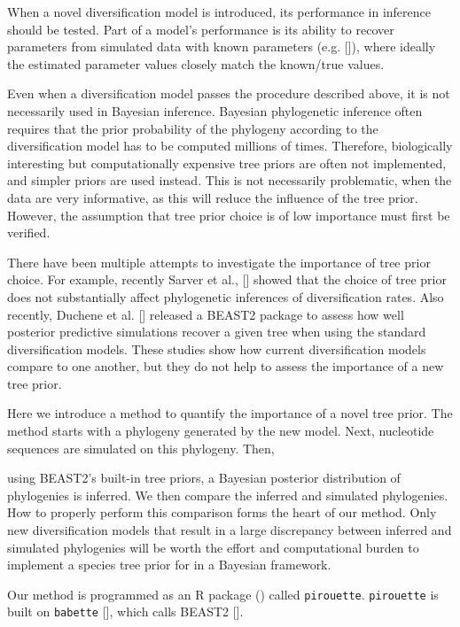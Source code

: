 When a novel diversification model is introduced,
its performance in inference should be tested.
Part of a model's performance is its ability to recover parameters from simulated data with known 
parameters (e.g. [\cite{etienne2014estimating}]), 
where ideally the estimated parameter values closely match the known/true values.

Even when a diversification model passes the procedure described above, it is not necessarily used in Bayesian inference.
Bayesian phylogenetic inference often requires 
that the prior probability of the phylogeny 
according to the diversification model has to be computed millions of times. 
Therefore, biologically interesting but computationally expensive tree priors 
are often not implemented, and simpler priors are used instead. 
This is not necessarily problematic, when the data are very informative, 
as this will reduce the influence of the tree prior.
However, the assumption that tree prior choice is of low importance must first be verified.

There have been multiple attempts to investigate the importance of tree
prior choice. For example, recently Sarver et al., [\cite{sarver2019choice}] 
showed that the choice of tree prior does not 
substantially affect phylogenetic inferences of diversification rates.
Also recently, Duchene et al. [\cite{duchene2018phylodynamic}] released
a BEAST2 package to assess how well posterior predictive simulations recover a given tree when using the standard diversification models.
These studies show how current diversification models compare to one another, but they do not help to assess 
the importance of a new tree prior. 

Here we introduce a method to quantify the importance of a novel tree prior.
The method starts with a phylogeny generated 
by the new model. 
Next, nucleotide sequences are simulated on  this phylogeny. 
Then,

using BEAST2's built-in tree priors,
a Bayesian posterior distribution of phylogenies is inferred. 
We then compare the inferred and simulated  phylogenies. 
How to properly perform this comparison forms the heart of our method.
Only new diversification models that result 
in a large discrepancy between inferred and simulated phylogenies will be worth the effort and computational burden to implement a species tree prior for in a Bayesian framework.

Our method is programmed as an R package (\cite{R}) called \verb;pirouette;.
\verb;pirouette; is built on \verb;babette; [\cite{bilderbeek2018babette}], 
which calls BEAST2 [\cite{bouckaert2019beast}]. 

